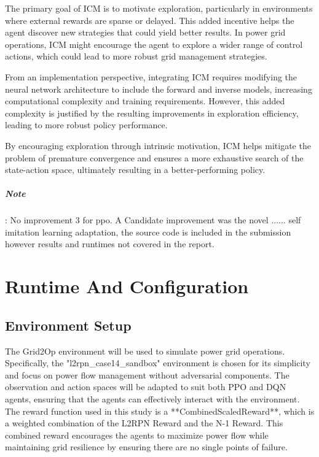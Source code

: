 \documentclass[
12pt, %
oneside, %
english, %
onehalfspacing, %
nolistspacing, %
liststotoc, %
headsepline, %
]{ProposalAndThesis} %
\begin{document}
The primary goal of ICM is to motivate exploration, particularly in environments where external rewards are sparse or delayed. This added incentive helps the agent discover new strategies that could yield better results. In power grid operations, ICM might encourage the agent to explore a wider range of control actions, which could lead to more robust grid management strategies.

From an implementation perspective, integrating ICM requires modifying the neural network architecture to include the forward and inverse models, increasing computational complexity and training requirements. However, this added complexity is justified by the resulting improvements in exploration efficiency, leading to more robust policy performance.

By encouraging exploration through intrinsic motivation, ICM helps mitigate the problem of premature convergence and ensures a more exhaustive search of the state-action space, ultimately resulting in a better-performing policy.

\paragraph{Note}: No improvement 3 for ppo. A Candidate improvement was the novel ...... self imitation learning adaptation, the source code is included in the submission however results and runtimes not covered in the report.

\chapter{Runtime And Configuration}

\section{Environment Setup}
The Grid2Op environment will be used to simulate power grid operations. Specifically, the "l2rpn\_case14\_sandbox" environment is chosen for its simplicity and focus on power flow management without adversarial components. The observation and action spaces will be adapted to suit both PPO and DQN agents, ensuring that the agents can effectively interact with the environment.
The reward function used in this study is a **CombinedScaledReward**, which is a weighted combination of the L2RPN Reward and the N-1 Reward. This combined reward encourages the agents to maximize power flow while maintaining grid resilience by ensuring there are no single points of failure.
\end{document}
